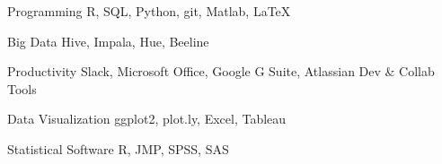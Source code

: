 

\begin{cvskills}

  \cvskill
    {Programming} %
    {R, SQL, Python, git, Matlab, \LaTeX} %

  \cvskill
    {Big Data} %
    {Hive, Impala, Hue, Beeline} %

  \cvskill
    {Productivity} %
    {Slack, Microsoft Office, Google G Suite, Atlassian Dev \& Collab Tools} %

  \cvskill
    {Data Visualization} %
    {ggplot2, plot.ly, Excel, Tableau} %

  \cvskill
    {Statistical Software} %
    {R, JMP, SPSS, SAS} %

\end{cvskills}
